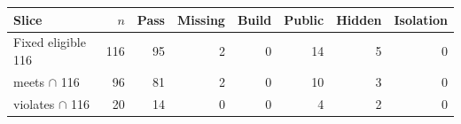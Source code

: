 \begin{tabular}{lrrrrrrr}
\toprule
\textbf{Slice} & \textbf{$n$} & \textbf{Pass} & \textbf{Missing} & \textbf{Build} & \textbf{Public} & \textbf{Hidden} & \textbf{Isolation} \\
\midrule
Fixed eligible 116 & 116 & 95 & 2 & 0 & 14 & 5 & 0 \\
meets $\cap$ 116 & 96 & 81 & 2 & 0 & 10 & 3 & 0 \\
violates $\cap$ 116 & 20 & 14 & 0 & 0 & 4 & 2 & 0 \\
\bottomrule
\end{tabular}
